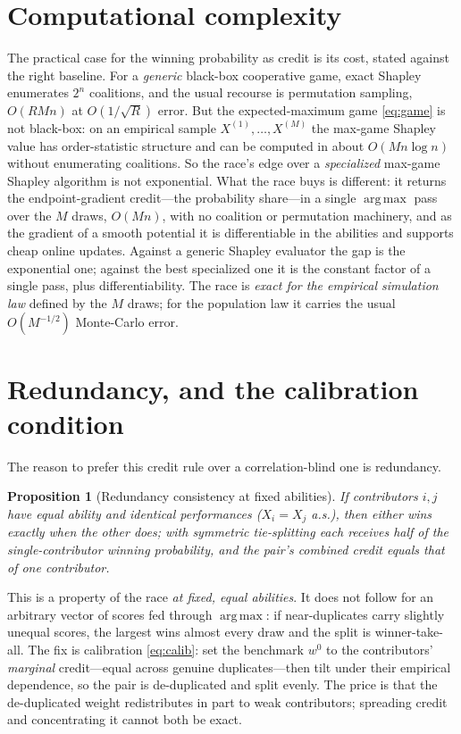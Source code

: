 \documentclass[11pt]{article}
\DeclareMathOperator*{\argmaxop}{arg\,max}
\newtheorem{proposition}{Proposition}
\begin{document}
\section{Computational complexity}
\label{sec:complexity}

The practical case for the winning probability as credit is its cost, stated against
the right baseline. For a \emph{generic} black-box cooperative game, exact Shapley
enumerates $2^n$ coalitions, and the usual recourse is permutation sampling,
$O(RMn)$ at $O(1/\sqrt R)$ error. But the expected-maximum game \eqref{eq:game} is
not black-box: on an empirical sample $X^{(1)},\dots,X^{(M)}$ the max-game Shapley
value has order-statistic structure and can be computed in about $O(Mn\log n)$
without enumerating coalitions. So the race's edge over a \emph{specialized} max-game
Shapley algorithm is not exponential. What the race buys is different: it returns the
endpoint-gradient credit---the probability share---in a single $\argmaxop$ pass over
the $M$ draws, $O(Mn)$, with no coalition or permutation machinery, and as the
gradient of a smooth potential it is differentiable in the abilities and supports
cheap online updates. Against a generic Shapley evaluator the gap is the exponential
one; against the best specialized one it is the constant factor of a single pass,
plus differentiability. The race is \emph{exact for the empirical simulation law}
defined by the $M$ draws; for the population law it carries the usual $O(M^{-1/2})$
Monte-Carlo error.

\section{Redundancy, and the calibration condition}
\label{sec:redundancy}

The reason to prefer this credit rule over a correlation-blind one is redundancy.

\begin{proposition}[Redundancy consistency at fixed abilities]
\label{prop:redundancy}
If contributors $i,j$ have equal ability and \emph{identical} performances
($X_i = X_j$ a.s.), then either wins exactly when the other does; with symmetric
tie-splitting each receives half of the single-contributor winning probability, and
the pair's combined credit equals that of one contributor.
\end{proposition}

This is a property of the race \emph{at fixed, equal abilities}. It does not follow
for an arbitrary vector of scores fed through $\argmaxop$: if near-duplicates carry
slightly unequal scores, the largest wins almost every draw and the split is
winner-take-all. The fix is calibration \eqref{eq:calib}: set the benchmark $w^0$ to
the contributors' \emph{marginal} credit---equal across genuine duplicates---then
tilt under their empirical dependence, so the pair is de-duplicated and split
evenly. The price is that the de-duplicated weight redistributes in part to weak
contributors; spreading credit and concentrating it cannot both be exact.
\end{document}
